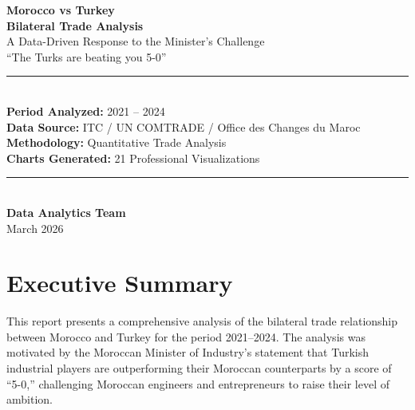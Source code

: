 \documentclass[12pt,a4paper]{article}
\begin{document}
\begin{titlepage}
\centering
\vspace*{2cm}

{\Huge\bfseries\color{darkblue} Morocco vs Turkey\\[0.5cm]
Bilateral Trade Analysis}\\[1cm]

{\Large\color{darkblue!70} A Data-Driven Response to the Minister's Challenge}\\[0.5cm]
{\large\color{gray} ``The Turks are beating you 5-0''}\\[2cm]

\rule{\textwidth}{1pt}\\[0.5cm]

{\large
\textbf{Period Analyzed:} 2021 -- 2024\\[0.3cm]
\textbf{Data Source:} ITC / UN COMTRADE / Office des Changes du Maroc\\[0.3cm]
\textbf{Methodology:} Quantitative Trade Analysis\\[0.3cm]
\textbf{Charts Generated:} 21 Professional Visualizations\\[0.3cm]
}

\rule{\textwidth}{1pt}\\[2cm]

{\Large\bfseries Data Analytics Team}\\[0.3cm]
{\large March 2026}

\vfill
\end{titlepage}

\tableofcontents
\newpage

\section{Executive Summary}

This report presents a comprehensive analysis of the bilateral trade relationship between Morocco and Turkey for the period 2021--2024. The analysis was motivated by the Moroccan Minister of Industry's statement that Turkish industrial players are outperforming their Moroccan counterparts by a score of ``5-0,'' challenging Moroccan engineers and entrepreneurs to raise their level of ambition.
\end{document}
